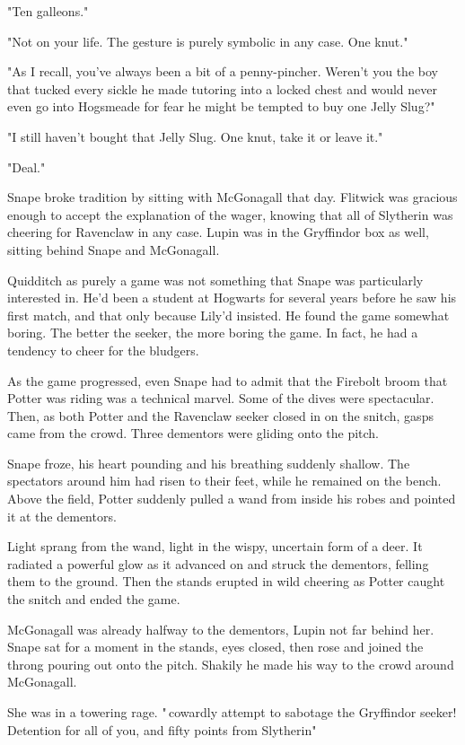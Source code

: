 "Ten galleons."

"Not on your life. The gesture is purely symbolic in any case. One knut."

"As I recall, you've always been a bit of a penny-pincher. Weren't you the boy that tucked every sickle he made tutoring into a locked chest and would never even go into Hogsmeade for fear he might be tempted to buy one Jelly Slug?"

"I still haven't bought that Jelly Slug. One knut, take it or leave it."

"Deal."

Snape broke tradition by sitting with McGonagall that day. Flitwick was gracious enough to accept the explanation of the wager, knowing that all of Slytherin was cheering for Ravenclaw in any case. Lupin was in the Gryffindor box as well, sitting behind Snape and McGonagall.

Quidditch as purely a game was not something that Snape was particularly interested in. He'd been a student at Hogwarts for several years before he saw his first match, and that only because Lily'd insisted. He found the game somewhat boring. The better the seeker, the more boring the game. In fact, he had a tendency to cheer for the bludgers.

As the game progressed, even Snape had to admit that the Firebolt broom that Potter was riding was a technical marvel. Some of the dives were spectacular. Then, as both Potter and the Ravenclaw seeker closed in on the snitch, gasps came from the crowd. Three dementors were gliding onto the pitch.

Snape froze, his heart pounding and his breathing suddenly shallow. The spectators around him had risen to their feet, while he remained on the bench. Above the field, Potter suddenly pulled a wand from inside his robes and pointed it at the dementors.

Light sprang from the wand, light in the wispy, uncertain form of a deer. It radiated a powerful glow as it advanced on and struck the dementors, felling them to the ground. Then the stands erupted in wild cheering as Potter caught the snitch and ended the game.

McGonagall was already halfway to the dementors, Lupin not far behind her. Snape sat for a moment in the stands, eyes closed, then rose and joined the throng pouring out onto the pitch. Shakily he made his way to the crowd around McGonagall.

She was in a towering rage. "{\el}\,cowardly attempt to sabotage the Gryffindor seeker! Detention for all of you, and fifty points from Slytherin{\el}"

